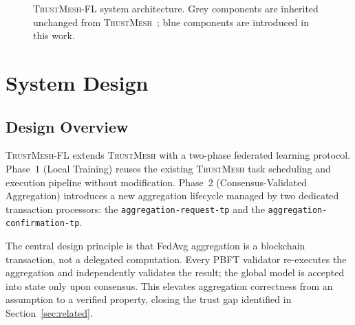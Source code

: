 \documentclass[lettersize,journal]{IEEEtran}
\newcommand{\tmfl}{\textsc{TrustMesh-FL}}
\newcommand{\tm}{\textsc{TrustMesh}}
\begin{document}
\begin{figure}[t]
    \caption{%
        \tmfl{} system architecture. Grey components are inherited unchanged from
        \tm{}~\cite{rangwala2025trustmesh}; blue components are introduced in this work.%
    }
    \label{fig:arch}
\end{figure}

\section{System Design}
\label{sec:design}

\subsection{Design Overview}

\tmfl{} extends \tm{} with a two-phase federated learning protocol. Phase~1 (Local
Training) reuses the existing \tm{} task scheduling and execution pipeline without
modification. Phase~2 (Consensus-Validated Aggregation) introduces a new aggregation
lifecycle managed by two dedicated transaction processors:
the \texttt{aggregation-request-tp} and the \texttt{aggregation-confirmation-tp}.

The central design principle is that FedAvg aggregation is a blockchain transaction, not a
delegated computation. Every PBFT validator re-executes the aggregation and independently
validates the result; the global model is accepted into state only upon consensus. This
elevates aggregation correctness from an assumption to a verified property, closing the
trust gap identified in Section~\ref{sec:related}.
\end{document}
